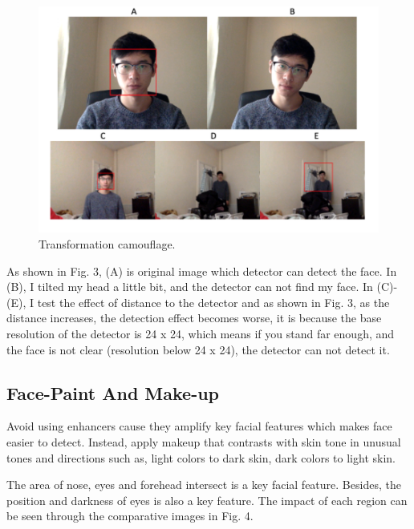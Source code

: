 \documentclass[conference]{IEEEtran}
\begin{document}
\begin{figure}
  \centerline{\includegraphics[scale=0.5]{./image/Transformation.png}}
  \caption{Transformation camouflage.}
  \label{fig}
\end{figure}

As shown in Fig. 3, (A) is original image which detector can detect the face. In (B), I tilted my head a little bit, and the detector can not find my face. In (C)-(E), I test the effect of distance to the detector and as shown in Fig. 3, as the distance increases, the detection effect becomes worse, it is because the base resolution of the detector is 24 x 24, which means if you stand far enough, and the face is not clear (resolution below 24 x 24), the detector can not detect it.

\subsection{Face-Paint And Make-up}
Avoid using enhancers cause they amplify key facial features which makes face easier to detect. Instead, apply makeup that contrasts with skin tone in unusual tones and directions such as, light colors to dark skin, dark colors to light skin.

The area of nose, eyes and forehead intersect is a key facial feature. Besides, the position and darkness of eyes is also a key feature. The impact of each region can be seen through the comparative images in Fig. 4.
\end{document}

